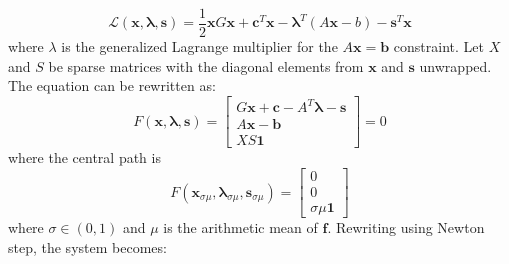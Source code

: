 \documentclass[12pt,a4paper,twoside]{report}
\begin{document}
\begin{equation}
\mathcal{L}(\boldsymbol{x}, \boldsymbol{\lambda}, \boldsymbol{s}) = \frac{1}{2}\boldsymbol{x}G\boldsymbol{x} + \boldsymbol{c}^T\boldsymbol{x} - \boldsymbol{\lambda}^T(A\boldsymbol{x}-b) - \boldsymbol{s}^T
\boldsymbol{x}
\end{equation}
where $\lambda$ is the generalized Lagrange multiplier for the $A\boldsymbol{x} = \boldsymbol{b}$ constraint. Let $X$ and $S$ be sparse matrices with the diagonal elements from $\boldsymbol{x}$ and $\boldsymbol{s}$ unwrapped. The equation can be rewritten as:
\begin{equation}
F(\boldsymbol{x}, \boldsymbol{\lambda}, \boldsymbol{s}) = 
	\begin{bmatrix}
G\boldsymbol{x} + \boldsymbol{c}-A^T\boldsymbol{\lambda} - \boldsymbol{s}\\
A\boldsymbol{x}-\boldsymbol{b} \\
XS\boldsymbol{1}
	\end{bmatrix} = 0
\end{equation}
where the central path is
\begin{equation}
	F(\boldsymbol{x}_{\sigma\mu}, \boldsymbol{\lambda}_{\sigma\mu}, \boldsymbol{s}_{\sigma\mu}) = \begin{bmatrix}
	0 \\ 0 \\ \sigma\mu \boldsymbol{1}
	\end{bmatrix}
\end{equation}
where $\sigma \in (0,1)$ and $\mu$ is the arithmetic mean of $\boldsymbol{f}$. Rewriting using Newton step, the system becomes:
\end{document}
